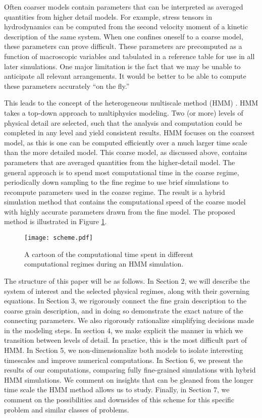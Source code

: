 \documentclass{article}
\begin{document}
Often coarser models contain parameters that can be interpreted as averaged quantities from higher detail models. For example, stress tensors in hydrodynamics can be computed from the second velocity moment of a kinetic description of the same system. When one confines oneself to a coarse model, these parameters can prove difficult. These parameters are precomputed as a function of macroscopic variables and tabulated in a reference table for use in all later simulations. One major limitation is the fact that we may be unable to anticipate all relevant arrangements. It would be better to be able to compute these parameters accurately ``on the fly.''

This leads to the concept of the heterogeneous multiscale method (HMM) \cite{weinan2007heterogeneous}. HMM takes a top-down approach to multiphysics modeling. Two (or more) levels of physical detail are selected, such that the analysis and computation could be completed in any level and yield consistent results. HMM focuses on the coarsest model, as this is one can be computed efficiently over a much larger time scale than the more detailed model. This coarse model, as discussed above, contains parameters that are averaged quantities from the higher-detail model. The general approach is to spend most computational time in the coarse regime, periodically down sampling to the fine regime to use brief simulations to recompute parameters used in the coarse regime. The result is a hybrid simulation method that contains the computational speed of the coarse model with highly accurate parameters drawn from the fine model. The proposed method is illustrated in Figure \ref{HMM}.



\begin{figure}[h]\begin{center}\texttt{[image: scheme.pdf]}\caption{A cartoon of the computational time spent in different computational regimes during an HMM simulation.}\label{HMM}\end{center}\end{figure}

The structure of this paper will be as follows. In Section 2, we will describe the system of interest and the selected physical regimes, along with their governing equations. In Section 3, we rigorously connect the fine grain description to the coarse grain description, and in doing so demonstrate the exact nature of the connecting parameters. We also rigorously rationalize simplifying decisions made in the modeling steps. In section 4, we make explicit the manner in which we transition between levels of detail. In practice, this is the most difficult part of HMM. In Section 5, we non-dimensionalize both models to isolate interesting timescales and improve numerical computations. In Section 6, we present the results of our computations, comparing fully fine-grained simulations with hybrid HMM simulations. We comment on insights that can be gleaned from the longer time scale the HMM method allows us to study. Finally, in Section 7, we comment on the possibilities and downsides of this scheme for this specific problem and similar classes of problems.
\end{document}
